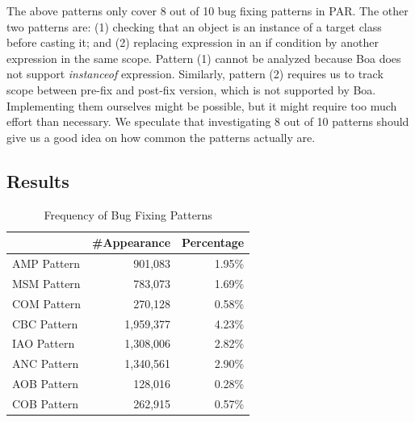 \documentclass{sig-alternate-05-2015}
\begin{document}
\vspace{1ex} The above patterns only cover 8 out of 10 bug fixing patterns in
PAR. The other two patterns are: (1) checking that an object is an instance of a
target class before casting it; and (2) replacing expression in an if condition
by another expression in the same scope. Pattern (1) cannot be analyzed because
Boa does not support {\em instanceof} expression. Similarly, pattern (2)
requires us to track scope between pre-fix and post-fix version, which is not
supported by Boa. Implementing them ourselves might be possible, but it might
require too much effort than necessary. We speculate that investigating 8 out of
10 patterns should give us a good idea on how common the patterns actually are.

\subsection{Results} \label{sec:freqfixpattern}

\begin{table}[!htb]
	\centering
	\begin{tabular}{lrr} 
		\hline
		& \textbf{\#Appearance} & \textbf{Percentage}\\
		\hline
		AMP Pattern & 901,083 & 1.95\%\\
		MSM Pattern & 783,073 & 1.69\%\\
		COM Pattern & 270,128 & 0.58\%\\ 
		CBC Pattern & 1,959,377 & 4.23\%\\  
		IAO Pattern & 1,308,006 & 2.82\%\\  
		ANC Pattern & 1,340,561 & 2.90\%\\  
		AOB Pattern & 128,016 & 0.28\%\\  
		COB Pattern & 262,915 & 0.57\%\\   
		\hline
	\end{tabular}
	\caption{Frequency of Bug Fixing Patterns}\label{tab:freqpattern}
	
\end{table}
\end{document}
